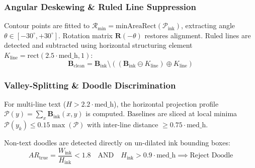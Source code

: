 \documentclass[default,iicol,sn-basic]{sn-jnl}
\begin{document}
{\subsubsection{Angular Deskewing & Ruled Line Suppression}
Contour points are fitted to $\mathcal{R}_{\text{min}} = \text{minAreaRect}(\mathcal{P}_{\text{ink}})$, extracting angle $\theta \in [-30^\circ, +30^\circ]$. Rotation matrix $\mathbf{R}(-\theta)$ restores alignment. Ruled lines are detected and subtracted using horizontal structuring element $K_{\text{line}} = \text{rect}(2.5 \cdot \text{med\_h}, 1)$:
\begin{equation}
\mathbf{B}_{\text{clean}} = \mathbf{B}_{\text{ink}} \setminus ((\mathbf{B}_{\text{ink}} \ominus K_{\text{line}}) \oplus K_{\text{line}})
\end{equation}

\subsubsection{Valley-Splitting & Doodle Discrimination}
For multi-line text ($H > 2.2 \cdot \text{med\_h}$), the horizontal projection profile $\mathcal{P}(y) = \sum_{x} \mathbf{B}_{\text{ink}}(x, y)$ is computed. Baselines are sliced at local minima $\mathcal{P}(y_k) \le 0.15 \max(\mathcal{P})$ with inter-line distance $\ge 0.75 \cdot \text{med\_h}$. 

Non-text doodles are detected directly on un-dilated ink bounding boxes:
\begin{equation}
AR_{\text{true}} = \frac{W_{\text{ink}}}{H_{\text{ink}}} < 1.8 \quad \text{AND} \quad H_{\text{ink}} > 0.9 \cdot \text{med\_h} \implies \text{Reject Doodle}
\end{equation}

}
\end{document}
